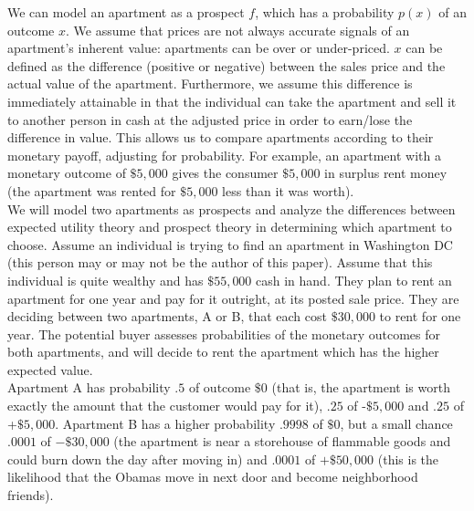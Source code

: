 \documentclass[a4paper,12pt]{article}
\numberwithin{equation}{section}
\theoremstyle{definition}
\begin{document}
We can model an apartment as a prospect $f$, which has a probability $p(x)$ of an outcome $x$. We assume that prices are not always accurate signals of an apartment's inherent value: apartments can be over or under-priced. $x$ can be defined as the difference (positive or negative) between the sales price and the actual value of the apartment. Furthermore, we assume this difference is immediately attainable in that the individual can take the apartment and sell it to another person in cash at the adjusted price in order to earn/lose the difference in value. This allows us to compare apartments according to their monetary payoff, adjusting for probability. For example, an apartment with a  monetary outcome of $\$5,000$ gives the consumer $\$5,000$ in surplus rent money (the apartment was rented for $\$5,000$ less than it was worth).
\\

We will model two apartments as prospects and analyze the differences between expected utility theory and prospect theory in determining which apartment to choose.
Assume an individual is trying to find an apartment in Washington DC (this person may or may not be the author of this paper). Assume that this individual is quite wealthy and has $\$55,000$ cash in hand. They plan to rent an apartment for one year and pay for it outright, at its posted sale price. They are deciding between two apartments, A or B, that each cost $\$30,000$ to rent for one year. The potential buyer assesses probabilities of the monetary outcomes for both apartments, and will decide to rent the apartment which has the higher expected value.
\\

Apartment A has probability $.5$ of outcome $\$0$ (that is, the apartment is worth exactly the amount that the customer would pay for it), $.25$ of -$\$5,000$ and $.25$ of +$\$5,000$. Apartment B has a higher probability $.9998$ of $\$0$, but a  small chance $.0001$ of $-\$30,000$ (the apartment is near a storehouse of flammable goods and could burn down the day after moving in) and $.0001$ of $+\$50,000$ (this is the likelihood that the Obamas move in next door and become neighborhood friends).
\\
\end{document}
